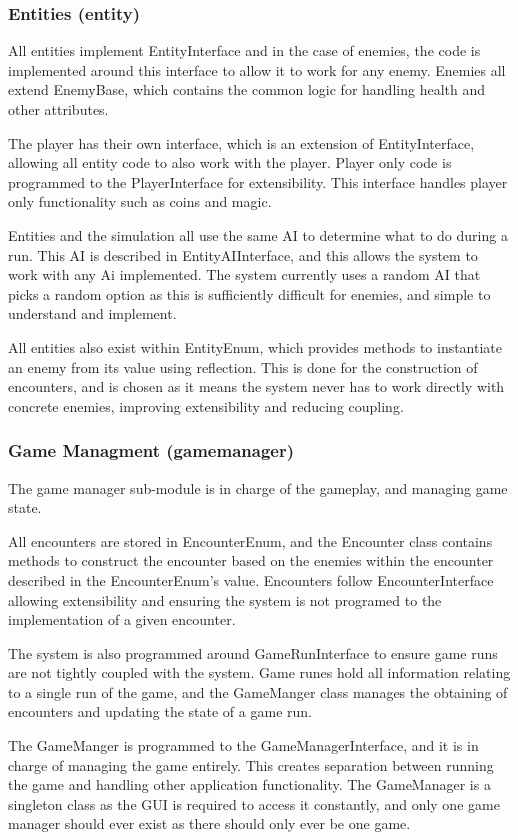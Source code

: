 \subsubsection{Entities (entity)}
All entities implement EntityInterface and in the case of enemies, the code is implemented around this interface to allow it to work for any enemy. Enemies all extend EnemyBase, which contains the common logic for handling health and other attributes.

The player has their own interface, which is an extension of EntityInterface, allowing all entity code to also work with the player. Player only code is programmed to the PlayerInterface for extensibility. This interface handles player only functionality such as coins and magic.

Entities and the simulation all use the same AI to determine what to do during a run. This AI is described in EntityAIInterface, and this allows the system to work with any Ai implemented. The system currently uses a random AI that picks a random option as this is sufficiently difficult for enemies, and simple to understand and implement.

All entities also exist within EntityEnum, which provides methods to instantiate an enemy from its value using reflection. This is done for the construction of encounters, and is chosen as it means the system never has to work directly with concrete enemies, improving extensibility and reducing coupling.

\subsubsection{Game Managment (gamemanager)}
The game manager sub-module is in charge of the gameplay, and managing game state.

All encounters are stored in EncounterEnum, and the Encounter class contains methods to construct the encounter based on the enemies within the encounter described in the EncounterEnum's value. Encounters follow EncounterInterface allowing extensibility and ensuring the system is not programed to the implementation of a given encounter.

The system is also programmed around GameRunInterface to ensure game runs are not tightly coupled with the system. Game runes hold all information relating to a single run of the game, and the GameManger class manages the obtaining of encounters and updating the state of a game run.

The GameManger is programmed to the GameManagerInterface, and it is in charge of managing the game entirely. This creates separation between running the game and handling other application functionality. The GameManager is a singleton class as the GUI is required to access it constantly, and only one game manager should ever exist as there should only ever be one game.

